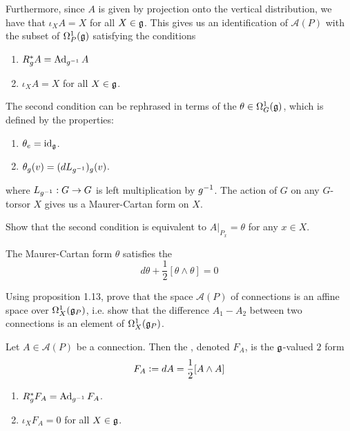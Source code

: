 %
Furthermore, since $A$ is given by projection onto the vertical distribution,
we have that $\iota_XA = X$ for all $X \in \mathfrak{g}$. This gives us an identification
of $\mathscr{A}(P)$ with the subset of $\Omega^1_P(\mathfrak{g})$ satisfying the conditions
\begin{enumerate}
  \item $R_g^*A = \operatorname{Ad}_{g^{-1}}A$
  \item $\iota_XA = X$ for all $X \in \mathfrak{g}$.
\end{enumerate}
%
The second condition can be rephrased in terms of the 
$\theta \in \Omega^1_G(\mathfrak{g})$, which is defined by the properties:
\begin{enumerate}
  \item $\theta_e = \operatorname{id}_{\mathfrak{g}}$.
  \item $\theta_g(v) = (dL_{g^{-1}})_g(v)$.
\end{enumerate}
where $L_{g^{-1}} : G \to G$ is left multiplication by $g^{-1}$. The action
of $G$ on any $G$-torsor $X$ gives us a Maurer-Cartan form on $X$.
%
\begin{exer}
Show that the second condition is equivalent to $A\vert_{P_x} = \theta$
for any $x \in X$.
\end{exer}
%
The Maurer-Cartan form $\theta$ satisfies the 
\[
d\theta + \frac{1}{2}[\theta\wedge\theta] = 0
\]
%
\begin{exer}
Using proposition 1.13, prove that the space $\mathscr{A}(P)$ of connections
is an affine space over $\Omega^1_X(\mathfrak{g}_P)$, i.e. show that the difference
$A_1 - A_2$ between two connections is an element of $\Omega^1_X(\mathfrak{g}_P)$.
\end{exer}
%
\begin{defn}
Let $A \in \mathscr{A}(P)$ be a connection. Then the ,
denoted $F_A$, is the $\mathfrak{g}$-valued $2$ form
\[
F_A \vcentcolon= dA = \frac{1}{2}[A \wedge A]
\]
\end{defn}
%
\begin{prop} \enumbreak
\begin{enumerate}
  \item $R^*_gF_A = \operatorname{Ad}_{g^{-1}}F_A$.
  \item $\iota_XF_A = 0$ for all $X \in \mathfrak{g}$.
\end{enumerate}
\end{prop}
%
